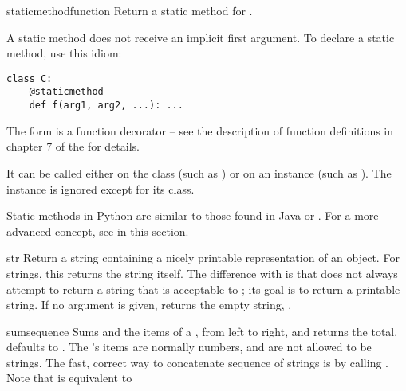 \begin{funcdesc}{staticmethod}{function}
  Return a static method for .

  A static method does not receive an implicit first argument.
  To declare a static method, use this idiom:

\begin{verbatim}
class C:
    @staticmethod
    def f(arg1, arg2, ...): ...
\end{verbatim}

  The  form is a function decorator -- see the description
  of function definitions in chapter 7 of the
   for details.

  It can be called either on the class (such as ) or on an
  instance (such as ).  The instance is ignored except
  for its class.

  Static methods in Python are similar to those found in Java or \Cpp.
  For a more advanced concept, see  in this
  section.
\end{funcdesc}

\begin{funcdesc}{str}{}
  Return a string containing a nicely printable representation of an
  object.  For strings, this returns the string itself.  The
  difference with  is that
   does not always attempt to return a string
  that is acceptable to ; its goal is to return a
  printable string.  If no argument is given, returns the empty
  string, .
\end{funcdesc}

\begin{funcdesc}{sum}{sequence}
  Sums  and the items of a , from left to
  right, and returns the total.   defaults to .
  The 's items are normally numbers, and are not allowed
  to be strings.  The fast, correct way to concatenate sequence of
  strings is by calling .
  Note that  is equivalent to
\end{funcdesc}

